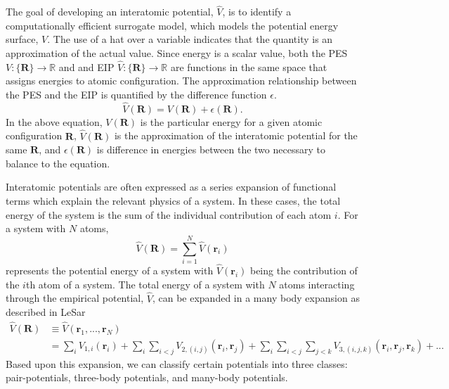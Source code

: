 The goal of developing an interatomic potential, $\hat{V}$, is to identify a computationally efficient surrogate model, which models the potential energy surface, $V$.  The use of a hat over a variable indicates that the quantity is an approximation of the actual value.
Since energy is a scalar value, both the PES ${V:\{\bm{R}\}\rightarrow \mathbb{R}}$ and and EIP ${\hat{V}:\{\bm{R}\} \rightarrow \mathbb{R}}$ are functions in the same space that assigns energies to atomic configuration.
The approximation relationship between the PES and the EIP is quantified by the difference function $\epsilon$.
\begin{equation}
	\label{eq:pes_approximation}
    \hat{V}(\bm{R})
		=
		V(\bm{R}) + \epsilon(\bm{R}).
\end{equation}
In the above equation, $V(\bm{R})$ is the particular energy for a given atomic configuration $\bm{R}$, $\hat{V}(\bm{R})$ is the approximation of the interatomic potential for the same ${\bm{R}}$, and $\epsilon(\bm{R})$ is difference in energies between the two necessary to balance to the equation.

Interatomic potentials are often expressed as a series expansion of functional terms which explain the relevant physics of a system.  In these cases, the total energy of the system is the sum of the individual contribution of each atom $i$.  For a system with $N$ atoms,
\begin{equation}
	\label{eq:potential_energy}
	\hat{V}(\bm{R})= \sum_{i=1}^{N} \hat{V}(\bm{r}_i)
\end{equation}
represents the potential energy of a system with $\hat{V}(\bm{r}_i)$ being the contribution of the $i$th atom of a system.
The total energy of a system with $N$ atoms interacting through the empirical potential, $\hat{V}$, can be expanded in a many body expansion as described in LeSar\cite{lesar2013_textbook}
\begin{align}
	\label{eq:potential_expansion_1}
	\hat{V}(\bm{R}) &\equiv \hat{V}(\bm{r}_1,...,\bm{r}_N) \\
	\label{eq:potential_expansion_2}
	          &= \sum_i V_{1,i} (\bm{r}_i)
	             + \sum_i \sum_{i<j} V_{2,(i,j)}(\bm{r}_i,\bm{r}_j)
		     + \sum_i \sum_{i<j} \sum_{j<k} V_{3,(i,j,k)}(\bm{r}_i,\bm{r}_j,\bm{r}_k)
		     + ...
\end{align}
Based upon this expansion, we can classify certain potentials into three classes: pair-potentials, three-body potentials, and many-body potentials.

